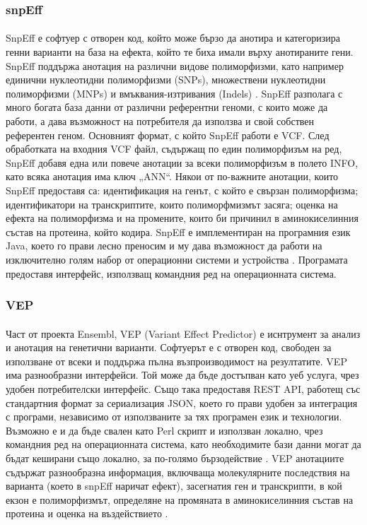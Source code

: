 \documentclass[pdftex,cyrillic,14pt,a4page,twoside,openright]{extreport}
\begin{document}
\subsubsection{snpEff}
\paragraph{}
SnpEff е софтуер с отворен код, който може бързо да анотира и категоризира генни варианти на база на ефекта, който те биха имали върху анотираните гени. SnpEff поддържа анотация на различни видове полиморфизми, като например единични нуклеотидни полиморфизми (SNPs), множествени нуклеотидни полиморфизми (MNPs) и вмъквания-изтривания (Indels) \cite{cingolani2012}. SnpEff разполага с много богата база данни от различни референтни геноми, с които може да работи, а дава възможност на потребителя да използва и свой собствен референтен геном. Основният формат, с който SnpEff работи е VCF. След обработката на входния VCF файл, съдържащ по един полиморфизъм на ред, SnpEff добавя една или повече анотации за всеки полиморфизъм в полето INFO, като всяка анотация има ключ „ANN“. Някои от по-важните анотации, които SnpEff предоставя са: идентификация на генът, с който е свързан полиморфизма; идентификатори на транскриптите, които полиморфмизмът засяга; оценка на ефекта на полиморфизма и на промените, които би причинил в аминокиселинния състав на протеина, който кодира. SnpEff е имплементиран на програмния език Java, което го прави лесно преносим и му дава възможност да работи на изключително голям набор от операционни системи и устройства \cite{schildt2020complete}. Програмата предоставя интерфейс, използващ командния ред на операционната система.

\subsubsection{VEP}
\paragraph{}
Част от проекта Ensembl, VEP (Variant Effect Predictor) е иснтрумент за анализ и анотация на генетични варианти. Софтуерът е с отворен код, свободен за използване от всеки и поддържа пълна възпроизводимост на резултатите. VEP има разнообразни интерфейси. Той може да бъде достъпван като уеб услуга, чрез удобен потребителски интерфейс. Също така предоставя REST API, работещ със стандартния формат за сериализация JSON, което го прави удобен за интеграция с програми, независимо от използваните за тях програмен език и технологии. Възможно е и да бъде свален като Perl скрипт и използван локално, чрез командния ред на операционната система, като необходимите бази данни могат да бъдат кеширани също локално, за по-голямо бързодействие \cite{mclaren2016}. VEP анотациите съдържат разнообразна информация, включваща молекулярните последствия на варианта (което в snpEff наричат ефект), засегнатия ген и транскрипти, в кой екзон е полиморфизмът, определяне на промяната в аминокиселинния състав на протеина и оценка на въздействието \cite{hunt2022}.
\end{document}
